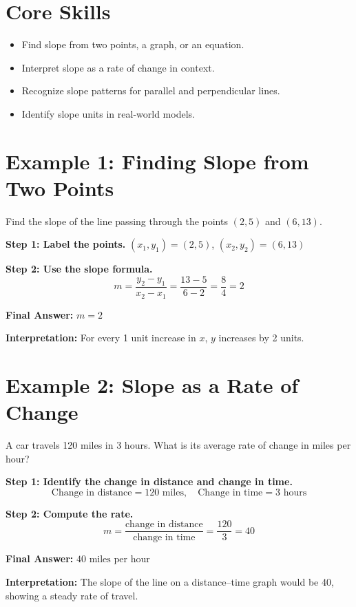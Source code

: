 \documentclass[14pt]{extarticle}
\begin{document}
\section*{Core Skills}
\begin{itemize}
    \item Find slope from two points, a graph, or an equation.
    \item Interpret slope as a rate of change in context.
    \item Recognize slope patterns for parallel and perpendicular lines.
    \item Identify slope units in real-world models.
\end{itemize}

\section*{Example 1: Finding Slope from Two Points}

Find the slope of the line passing through the points \((2, 5)\) and \((6, 13)\).

\textbf{Step 1: Label the points.}  
\((x_1, y_1) = (2, 5)\), \((x_2, y_2) = (6, 13)\)

\textbf{Step 2: Use the slope formula.}
\[
m = \frac{y_2 - y_1}{x_2 - x_1} = \frac{13 - 5}{6 - 2} = \frac{8}{4} = 2
\]

\textbf{Final Answer:} \(\boxed{m = 2}\)

\textbf{Interpretation:} For every 1 unit increase in \(x\), \(y\) increases by 2 units.

\section*{Example 2: Slope as a Rate of Change}

A car travels 120 miles in 3 hours. What is its average rate of change in miles per hour?

\textbf{Step 1: Identify the change in distance and change in time.}  
\[
\text{Change in distance} = 120 \text{ miles}, \quad \text{Change in time} = 3 \text{ hours}
\]

\textbf{Step 2: Compute the rate.}
\[
m = \frac{\text{change in distance}}{\text{change in time}} = \frac{120}{3} = 40
\]

\textbf{Final Answer:} \(\boxed{40 \text{ miles per hour}}\)

\textbf{Interpretation:} The slope of the line on a distance–time graph would be 40, showing a steady rate of travel.
\end{document}
